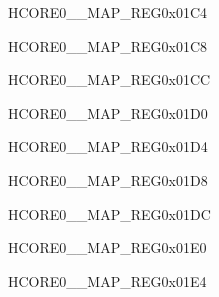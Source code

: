 \begin{register}{H}{CORE0\_\_MAP\_REG}{0x01C4}\label{regdesc:CORE0HPPARLIORXINTMAPREG}
\end{register}\vspace{-3em}


\begin{register}{H}{CORE0\_\_MAP\_REG}{0x01C8}\label{regdesc:CORE0HPPARLIOTXINTMAPREG}
\end{register}\vspace{-3em}


\begin{register}{H}{CORE0\_\_MAP\_REG}{0x01CC}\label{regdesc:CORE0H264DMA2DOUTCH0INTMAPREG}
\end{register}\vspace{-3em}


\begin{register}{H}{CORE0\_\_MAP\_REG}{0x01D0}\label{regdesc:CORE0H264DMA2DOUTCH1INTMAPREG}
\end{register}\vspace{-3em}


\begin{register}{H}{CORE0\_\_MAP\_REG}{0x01D4}\label{regdesc:CORE0H264DMA2DOUTCH2INTMAPREG}
\end{register}\vspace{-3em}


\begin{register}{H}{CORE0\_\_MAP\_REG}{0x01D8}\label{regdesc:CORE0H264DMA2DOUTCH3INTMAPREG}
\end{register}\vspace{-3em}


\begin{register}{H}{CORE0\_\_MAP\_REG}{0x01DC}\label{regdesc:CORE0H264DMA2DOUTCH4INTMAPREG}
\end{register}\vspace{-3em}


\begin{register}{H}{CORE0\_\_MAP\_REG}{0x01E0}\label{regdesc:CORE0H264DMA2DINCH0INTMAPREG}
\end{register}\vspace{-3em}


\begin{register}{H}{CORE0\_\_MAP\_REG}{0x01E4}\label{regdesc:CORE0H264DMA2DINCH1INTMAPREG}
\end{register}\vspace{-3em}


